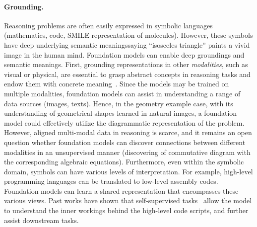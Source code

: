 \paragraph{Grounding.} Reasoning problems are often easily expressed in symbolic languages (\eg mathematics, code, SMILE representation of molecules). However, these symbols have deep underlying semantic meanings\dash{}saying ``isosceles triangle'' paints a vivid image in the human mind. Foundation models can enable deep groundings and semantic meanings. First, grounding representations in other \emph{modalities}, such as visual or physical, are essential to grasp abstract concepts in reasoning tasks and endow them with concrete meaning~\citep{Larkin1987Simon,Jamnik2001MathematicalRW}. Since the models may be trained on multiple modalities, foundation models can assist in understanding a range of data sources (\eg images, texts). Hence, in the geometry example case, with its understanding of geometrical shapes learned in natural images, a foundation model could effectively utilize the diagrammatic representation of the problem. However, aligned multi-modal data in reasoning is scarce, and it remains an open question whether foundation models can discover connections between different modalities in an unsupervised manner (\eg discovering of commutative diagram with the corresponding algebraic equations).
Furthermore, even within the symbolic domain, symbols can have various levels of interpretation. 
For example, high-level programming languages can be translated to low-level assembly codes. Foundation models can learn a shared representation that encompasses these various views. Past works have shown that self-supervised tasks~\citep{pact, DBLP:journals/corr/abs-2105-04297,DBLP:journals/corr/abs-2103-03809} allow the model to understand the inner workings behind the high-level code scripts, and further assist downstream tasks. 

